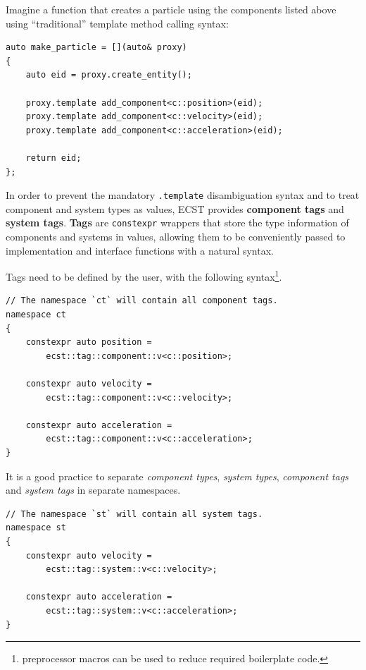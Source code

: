\documentclass[twoside, 12pt, a4paper, openany]{book}
\begin{document}
Imagine a function that creates a particle using the components listed
above using ``traditional'' template method calling syntax:

\begin{verbatim}
auto make_particle = [](auto& proxy)
{
    auto eid = proxy.create_entity();

    proxy.template add_component<c::position>(eid);
    proxy.template add_component<c::velocity>(eid);
    proxy.template add_component<c::acceleration>(eid);

    return eid;
};
\end{verbatim}

In order to prevent the mandatory
\texttt{.template}
disambiguation syntax and to treat component and system types as values,
ECST provides \textbf{component tags} and \textbf{system tags}.
\textbf{Tags} are
\texttt{constexpr}
wrappers that store the type information of components and systems in
values, allowing them to be conveniently passed to implementation and
interface functions with a natural syntax.

Tags need to be defined by the user, with the following syntax\footnote{preprocessor
  macros can be used to reduce required boilerplate code.}.

\begin{verbatim}
// The namespace `ct` will contain all component tags.
namespace ct
{
    constexpr auto position =
        ecst::tag::component::v<c::position>;

    constexpr auto velocity =
        ecst::tag::component::v<c::velocity>;

    constexpr auto acceleration =
        ecst::tag::component::v<c::acceleration>;
}
\end{verbatim}

It is a good practice to separate \emph{component types}, \emph{system
types}, \emph{component tags} and \emph{system tags} in separate
namespaces.

\begin{verbatim}
// The namespace `st` will contain all system tags.
namespace st
{
    constexpr auto velocity =
        ecst::tag::system::v<c::velocity>;

    constexpr auto acceleration =
        ecst::tag::system::v<c::acceleration>;
}
\end{verbatim}
\end{document}
